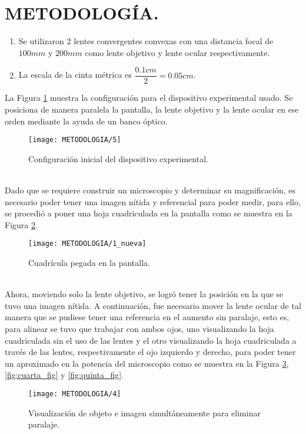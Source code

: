 \documentclass[10pt,a4paper]{article}
\begin{document}

\section{METODOLOGÍA.} %
\begin{enumerate}
	\item Se utilizaron 2 lentes convergentes convexas con una distancia focal de $100mm$ y $200mm$ como lente objetivo y lente ocular respectivamente.
	\item La escala de la cinta métrica es $\dfrac{0.1cm}{2}=0.05cm$.
\end{enumerate}
La Figura \ref{fig:primer_fig} muestra la configuración para el dispositivo experimental usado. Se posiciona de manera paralela la pantalla, la lente objetivo y la lente ocular en ese orden mediante la ayuda de un banco óptico. \\[2mm]
\begin{figure}[ht]
	\centering
	\texttt{[image: METODOLOGIA/5]}
	\caption{Configuración inicial del dispositivo experimental.}
	\label{fig:primer_fig}
\end{figure}\\
Dado que se requiere construir un microscopio y determinar su magnificación, es necesario poder tener una imagen nítida y referencial para poder medir, para ello, se procedió a poner una hoja cuadriculada en la pantalla como se muestra en la Figura \ref{fig:segunda_fig}. \\[2mm]
\begin{figure}[ht]
	\centering
	\texttt{[image: METODOLOGIA/1\_nueva]}
	\caption{Cuadrícula pegada en la pantalla.}
	\label{fig:segunda_fig}
\end{figure}\\
Ahora, moviendo solo la lente objetivo, se logró tener la posición en la que se tuvo una imagen nítida. A continuación, fue necesario mover la lente ocular de tal manera que se pudiese tener una referencia en el aumento sin paralaje, esto es, para alinear se tuvo que trabajar con ambos ojos, uno visualizando la hoja cuadriculada sin el uso de las lentes y el otro visualizando la hoja cuadriculada a través de las lentes, respectivamente el ojo izquierdo y derecho, para poder tener un aproximado en la potencia del microscopio como se muestra en la Figura \ref{fig:tercer_fig}, \ref{fig:cuarta_fig} y \ref{fig:quinta_fig}. \\[2mm]
\begin{figure}[ht]
	\centering
	\texttt{[image: METODOLOGIA/4]}
	\caption{Visualización de objeto e imagen simultáneamente para eliminar paralaje.}
	\label{fig:tercer_fig}
\end{figure}\\
\end{document}
